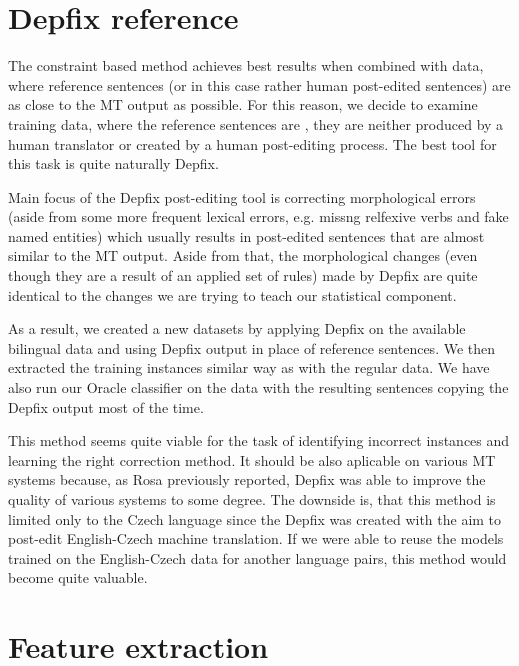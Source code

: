 \section{Depfix reference}

The constraint based method achieves best results when combined with data, where reference sentences
(or in this case rather human post-edited sentences) are as close to the MT output as possible.
For this reason, we decide to examine training data, where the reference sentences are ,
they are neither produced by a human translator or created by a human post-editing process.
The best tool for this task is quite naturally Depfix.

Main focus of the Depfix post-editing tool is correcting morphological errors (aside from some more
frequent lexical errors, e.g. missng relfexive verbs and fake named entities) which usually 
results in post-edited sentences that are almost similar to the MT output. Aside from that,
the morphological changes (even though they are a result of an applied set of rules) made
by Depfix are quite identical to the changes we are trying to teach our statistical component.

As a result, we created a new datasets by applying Depfix on the available bilingual data and
using Depfix output in place of reference sentences. We then extracted the training instances
similar way as with the regular data. We have also run our Oracle classifier on the data with
the resulting sentences copying the Depfix output most of the time.

This method seems quite viable for the task of identifying incorrect instances and learning the
right correction method. It should be also aplicable on various MT systems because, as Rosa
previously reported, Depfix was able to improve the quality of various systems to some degree.
The downside is, that this method is limited only to the Czech language since the Depfix was
created with the aim to post-edit English-Czech machine translation. If we were able to
reuse the models trained on the English-Czech data for another language pairs, this method
would become quite valuable. 

\section{Feature extraction}



